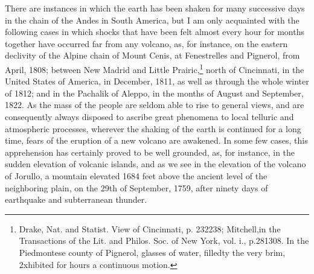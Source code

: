 There are instances in which the earth has been shaken for many successive days in the chain of the Andes in South America, but I am only acquainted with the following cases in which shocks that have been felt almost every hour for months together have occurred far from any volcano, as, for instance, on the eastern declivity of the Alpine chain of Mount Cenis, at Fenestrelles and Pignerol, from April, 1808; between New Madrid and Little Prairic,\footnote{Drake, Nat. and Statist. View of Cincinnati, p. 232238; Mitchell,in the Transactions of the Lit. and Philos. Soc. of New York, vol. i., p.281308. In the Piedmontese county of Pignerol, glasses of water, filledty the very brim, 2xhibited for hours a continuous motion.} north of Cincinnati, in the United States of America, in December, 1811, as well as through the whole winter of 1812; and in the Pachalik of Aleppo, in the months of August and September, 1822. As the mass of the people are seldom able to rise to general views, and are consequently always disposed to ascribe great phenomena to local telluric and atmospheric processes, wherever the shaking of the earth is continued for a long time, fears of the eruption of a new volcano are awakened. In some few cases, this apprehension has certainly proved to be well grounded, as, for instance, in the sudden elevation of volcanic islands, and as we see in the elevation of the volcano of Jorullo, a mountain elevated 1684 feet above the ancient level of the neighboring plain, on the 29th of September, 1759, after ninety days of earthquake and subterranean thunder.

